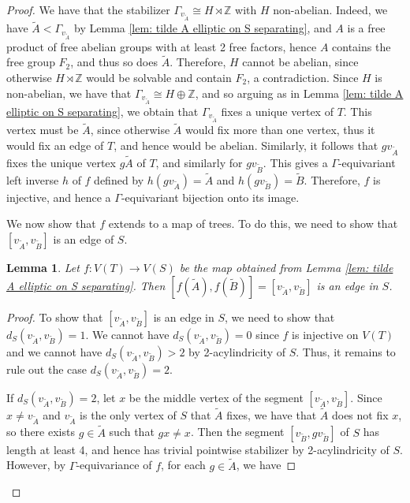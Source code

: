 \documentclass{amsart}
\newcommand{\Z}{\mathbb{Z}}
\theoremstyle{plain}
\newtheorem{lemma}[thm]{Lemma}
\theoremstyle{definition}
\theoremstyle{remark}
\begin{document}
\begin{proof}
    We have that the stabilizer $\Gamma_{v_{\tilde{A}}} \cong H \rtimes \Z$ with $H$ non-abelian. Indeed, we have $\tilde{A} < \Gamma_{v_{\tilde{A}}}$ by Lemma \ref{lem: tilde A elliptic on S separating}, and $A$ is a free product of free abelian groups with at least 2 free factors, hence $A$ contains the free group $F_2$, and thus so does $\tilde{A}$. Therefore, $H$ cannot be abelian, since otherwise $H \rtimes \Z$ would be solvable and contain $F_2$, a contradiction. Since $H$ is non-abelian, we have that $\Gamma_{v_{\tilde{A}}} \cong H \oplus \Z$, and so arguing as in Lemma \ref{lem: tilde A elliptic on S separating}, we obtain that $\Gamma_{v_{\tilde{A}}}$ fixes a unique vertex of $T$. This vertex must be $\tilde{A}$, since otherwise $\tilde{A}$ would fix more than one vertex, thus it would fix an edge of $T$, and hence would be abelian. Similarly, it follows that $gv_{\tilde{A}}$ fixes the unique vertex $g\tilde{A}$ of $T$, and similarly for $g v_{\tilde{B}}$. This gives a $\Gamma$-equivariant left inverse $h$ of $f$ defined by $h(gv_{\tilde{A}}) = \tilde{A}$ and $h(gv_{\tilde{B}}) = \tilde{B}$. Therefore, $f$ is injective, and hence a $\Gamma$-equivariant bijection onto its image. 
    
    We now show that $f$ extends to a map of trees. To do this, we need to show that $[v_{\tilde{A}}, v_{\tilde{B}}]$ is an edge of $S$.
    \begin{lemma}
        \label{lem: map on vertices is tree map}
        Let $f: V(T) \to V(S)$ be the map obtained from Lemma \ref{lem: tilde A elliptic on S separating}. Then $[f(\tilde{A}), f(\tilde{B})] = [v_{\tilde{A}}, v_{\tilde{B}}]$ is an edge in $S$.  
    \end{lemma}

    \begin{proof}
        To show that $[v_{\tilde{A}}, v_{\tilde{B}}]$ is an edge in $S$, we need to show that $d_S(v_{\tilde{A}}, v_{\tilde{B}}) = 1$. We cannot have $d_S(v_{\tilde{A}}, v_{\tilde{B}}) = 0$ since $f$ is injective on $V(T)$ and we cannot have $d_S(v_{\tilde{A}}, v_{\tilde{B}}) > 2$ by 2-acylindricity of $S$. Thus, it remains to rule out the case $d_S(v_{\tilde{A}}, v_{\tilde{B}}) = 2$. 

    If $d_S(v_{\tilde{A}}, v_{\tilde{B}}) = 2$, let $x$ be the middle vertex of the segment $[v_{\tilde{A}}, v_{\tilde{B}}]$. Since $x \neq v_{\tilde{A}}$ and $v_{\tilde{A}}$ is the only vertex of $S$ that $\tilde{A}$ fixes, we have that $\tilde{A}$ does not fix $x$, so there exists $g \in \tilde{A}$ such that $gx \neq x$. Then the segment $[v_{\tilde{B}}, gv_{\tilde{B}}]$ of $S$ has length at least 4, and hence has trivial pointwise stabilizer by 2-acylindricity of $S$. However, by $\Gamma$-equivariance of $f$, for each $g \in \tilde{A}$, we have 


\end{proof}
\end{proof}
\end{document}
